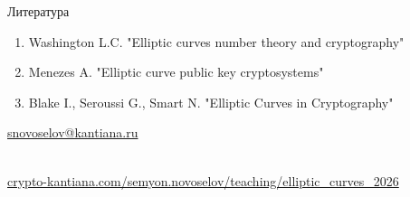 \documentclass{beamer}
\begin{document}
	\begin{frame}{Литература}
		\nocite{Menezes1993}\nocite{Blake1999}\nocite{Washington2008}
		
		\begin{enumerate}
			\item[\structure{\faBook}] Washington L.C. "Elliptic curves number theory and cryptography"%
			\vspace{0.5em}
			
			\item[\structure{\faBook}] Menezes A. "Elliptic curve public key cryptosystems"
			\vspace{0.5em}
			
			\item[\structure{\faBook}] Blake I., Seroussi G., Smart N. "Elliptic Curves in Cryptography"
		\end{enumerate}
		
		\begin{center}
			\begin{tcolorbox}[enhanced,hbox,colback=block-green-color-bg,colframe=subsection-color!120,title=Контакты,center title]
				\begin{varwidth}{\textwidth}
					\begin{center}
						\href{mailto:snovoselov@kantiana.ru}{snovoselov@kantiana.ru}
					\end{center}
				\end{varwidth}
			\end{tcolorbox}	
		\end{center}
		
		\\
		{\footnotesize
			\href{https://crypto-kantiana.com/semyon.novoselov/teaching/elliptic_curves_2026}{crypto-kantiana.com/semyon.novoselov/teaching/elliptic\_curves\_2026}
		}
		
	\end{frame}
	
\end{document}
